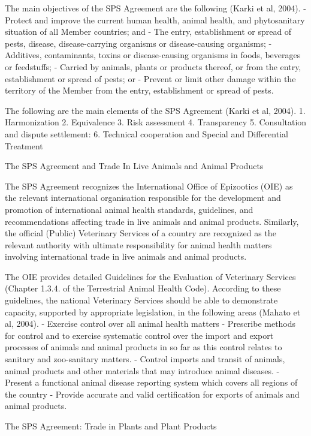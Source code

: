 \documentclass[]{book}
\begin{document}
The main objectives of the SPS Agreement are the following (Karki et al, 2004).
- Protect and improve the current human health, animal health, and phytosanitary situation of all Member countries; and
- The entry, establishment or spread of pests, disease, disease-carrying organisms or disease-causing organisms;
- Additives, contaminants, toxins or disease-causing organisms in foods, beverages or feedstuffs;
- Carried by animals, plants or products thereof, or from the entry, establishment or spread of pests; or
- Prevent or limit other damage within the territory of the Member from the entry, establishment or spread of pests.

The following are the main elements of the SPS Agreement (Karki et al, 2004).
1. Harmonization
2. Equivalence
3. Risk assessment
4. Transparency
5. Consultation and dispute settlement:
6. Technical cooperation and Special and Differential Treatment

The SPS Agreement and Trade In Live Animals and Animal Products

The SPS Agreement recognizes the International Office of Epizootics (OIE) as the relevant international organisation responsible for the development and promotion of international animal health standards, guidelines, and recommendations affecting trade in live animals and animal products. Similarly, the official (Public) Veterinary Services of a country are recognized as the relevant authority with ultimate responsibility for animal health matters involving international trade in live animals and animal products.

The OIE provides detailed Guidelines for the Evaluation of Veterinary Services (Chapter 1.3.4. of the Terrestrial Animal Health Code). According to these guidelines, the national Veterinary Services should be able to demonstrate capacity, supported by appropriate legislation, in the following areas (Mahato et al, 2004).
- Exercise control over all animal health matters
- Prescribe methods for control and to exercise systematic control over the import and export processes of animals and animal products in so far as this control relates to sanitary and zoo-sanitary matters.
- Control imports and transit of animals, animal products and other materials that may introduce animal diseases.
- Present a functional animal disease reporting system which covers all regions of the country
- Provide accurate and valid certification for exports of animals and animal products.

The SPS Agreement: Trade in Plants and Plant Products
\end{document}
